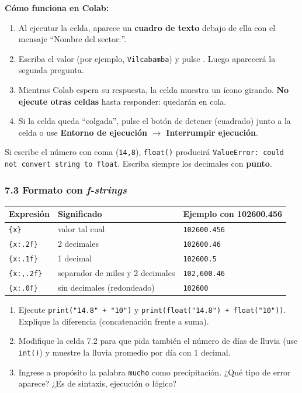 \documentclass[11pt,a4paper]{article}
\newcommand{\code}[1]{\texttt{#1}}
\newcommand{\menu}[1]{\textbf{\color{moradoOsc}#1}}
\newcommand{\tecla}[1]{\tcbox[on line,boxsep=1pt,left=3pt,right=3pt,top=1pt,bottom=1pt,
  colback=grisClaro,colframe=grafito!60,boxrule=0.5pt,arc=2pt]{\ttfamily\small #1}}
\begin{document}
\textbf{Cómo funciona en Colab:}
\begin{enumerate}
  \item Al ejecutar la celda, aparece un \textbf{cuadro de texto} debajo de ella con el mensaje ``Nombre del sector:''.
  \item Escriba el valor (por ejemplo, \code{Vilcabamba}) y pulse \tecla{Enter}. Luego aparecerá la segunda pregunta.
  \item Mientras Colab espera su respuesta, la celda muestra un ícono girando. \textbf{No ejecute otras celdas} hasta responder: quedarán en cola.
  \item Si la celda queda ``colgada'', pulse el botón de detener (cuadrado) junto a la celda o use \menu{Entorno de ejecución $\rightarrow$ Interrumpir ejecución}.
\end{enumerate}

\begin{warn}
Si escribe el número con coma (\code{14,8}), \code{float()} producirá \code{ValueError: could not convert string to float}. Escriba siempre los decimales con \textbf{punto}.
\end{warn}

\subsubsection{7.3 Formato con \emph{f-strings}}
\begin{center}
\renewcommand{\arraystretch}{1.25}
\begin{tabular}{l l l}
\toprule
\textbf{Expresión} & \textbf{Significado} & \textbf{Ejemplo con 102600.456} \\
\midrule
\code{\{x\}} & valor tal cual & \code{102600.456} \\
\code{\{x:.2f\}} & 2 decimales & \code{102600.46} \\
\code{\{x:.1f\}} & 1 decimal & \code{102600.5} \\
\code{\{x:,.2f\}} & separador de miles y 2 decimales & \code{102,600.46} \\
\code{\{x:.0f\}} & sin decimales (redondeado) & \code{102600} \\
\bottomrule
\end{tabular}
\end{center}

\begin{experimente}
\begin{enumerate}[nosep]
  \item Ejecute \code{print("14.8" + "10")} y \code{print(float("14.8") + float("10"))}. Explique la diferencia (concatenación frente a suma).
  \item Modifique la celda 7.2 para que pida también el número de días de lluvia (use \code{int()}) y muestre la lluvia promedio por día con 1 decimal.
  \item Ingrese a propósito la palabra \code{mucho} como precipitación. ¿Qué tipo de error aparece? ¿Es de sintaxis, ejecución o lógico?
\end{enumerate}
\end{experimente}
\end{document}
